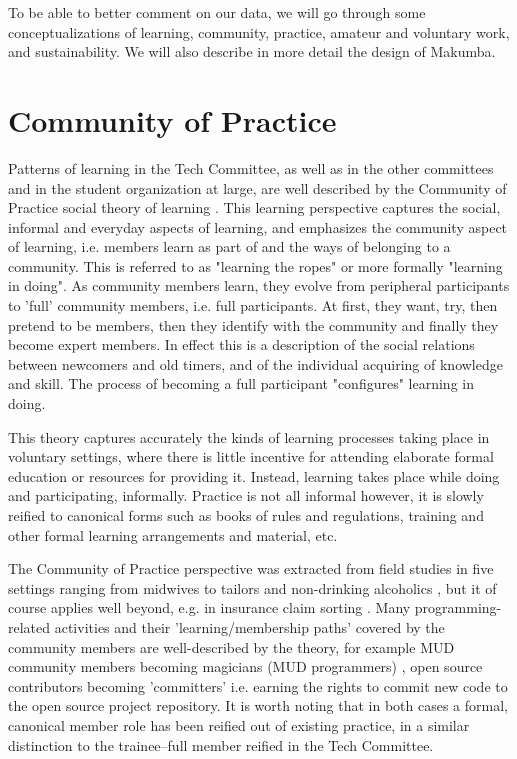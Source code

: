 \documentclass{sig-alt-release2}
\begin{document}
To be able to better comment on our data, we will go through some conceptualizations of learning, community, practice, amateur and voluntary work, and sustainability. We will also describe in more detail the design of Makumba.

\section{Community of Practice}\label{sec:cop}
Patterns of learning in the Tech Committee, as well as in the other committees and in the student organization at large, are well described by the Community of Practice social theory of learning  \cite{lave_wenger91, wenger98}. This learning perspective captures the social, informal and everyday aspects of learning, and emphasizes the community aspect of learning, i.e. members learn as part of and the ways of belonging to a community. This is referred to as "learning the ropes" or more formally "learning in doing".  As community members learn, they evolve from peripheral participants to 'full' community members, i.e. full participants. At first, they want, try, then pretend to be members, then they identify with the community and finally they become expert members. 
In effect this is a description of the social relations between newcomers and old timers, and of the individual acquiring of knowledge and skill. The process of becoming a full participant "configures" learning in doing.

This theory captures accurately the kinds of learning processes taking place in voluntary settings, where there is little incentive for attending elaborate formal education or resources for providing it. Instead, learning takes place while doing and participating, informally.
Practice is not all informal however, it is slowly reified \cite{wenger98} to canonical forms such as books of rules and regulations, training and other formal learning arrangements and material, etc. 

The Community of Practice perspective was extracted from field studies in five settings ranging from midwives to tailors and non-drinking alcoholics \cite{lave_wenger91}, but it of course applies well beyond, e.g. in insurance claim sorting \cite{wenger98}. Many programming-related activities and their 'learning/membership paths' covered by the community members are well-described by the theory, for example MUD community members becoming magicians (MUD programmers) \cite{pargman00, pargman05}, open source contributors becoming 'committers' i.e. earning the rights to commit new code to the open source project repository. It is worth noting that in both cases a formal, canonical member role has been reified out of existing practice, in a similar distinction to the trainee--full member reified in the Tech Committee.
\end{document}
